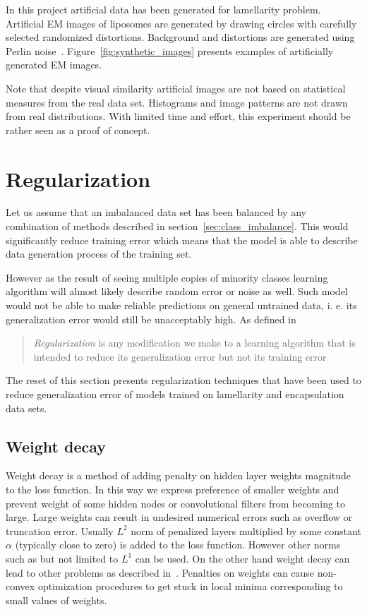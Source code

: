 \documentclass[a4paper, 11pt, table]{article}
\begin{document}
In this project artificial data has been generated for lamellarity problem. Artificial EM images of liposomes are generated by drawing circles with carefully selected randomized distortions. Background and distortions are generated using Perlin noise~\cite{Perlin:1985:IS:325165.325247}. Figure~\ref{fig:synthetic_images} presents examples of artificially generated EM images.

Note that despite visual similarity artificial images are not based on statistical measures from the real data set. Histograms and image patterns are not drawn from real distributions. With limited time and effort, this experiment should be rather seen as a proof of concept.


\section{Regularization}
\label{sec:regularization}

Let us assume that an imbalanced data set has been balanced by any combination of methods described in section~\ref{sec:class_imbalance}. This would significantly reduce training error which means that the model is able to describe data generation process of the training set. 

However as the result of seeing multiple copies of minority classes learning algorithm will almost likely describe random error or noise as well. Such model would not be able to make reliable predictions on general untrained data, i. e. its generalization error would still be unacceptably high. As defined in~\cite{dl_book} \blockquote{\textit{Regularization} is any modification we make to a learning algorithm that is intended to reduce its generalization error but not its training error}.

The reset of this section presents regularization techniques that have been used to reduce generalization error of models trained on lamellarity and encapsulation data sets.

\subsection{Weight decay}
Weight decay is a method of adding penalty on hidden layer weights magnitude to the loss function. In this way we express preference of smaller weights and prevent weight of some hidden nodes or convolutional filters from becoming to large. Large weights can result in undesired numerical errors such as overflow or truncation error. Usually $L^2$ norm of penalized layers multiplied by some constant $\alpha$ (typically close to zero) is added to the loss function. However other norms such as but not limited to $L^1$ can be used. 
On the other hand weight decay can lead to other problems as described in~\cite{dl_book}. Penalties on weights can cause non-convex optimization procedures to get stuck in local minima corresponding to small values of weights. 
\end{document}
